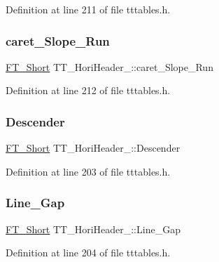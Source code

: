 Definition at line 211 of file tttables.\+h.

\mbox{\label{struct_t_t___hori_header___acce162ae0554006c11a3383bd3454d69}} 
\subsubsection{\texorpdfstring{caret\_Slope\_Run}{caret\_Slope\_Run}}
{\footnotesize\ttfamily \mbox{\hyperlink{fttypes_8h_aa7279be89046a2563cd3d4d6651fbdcf}{F\+T\+\_\+\+Short}} T\+T\+\_\+\+Hori\+Header\+\_\+\+::caret\+\_\+\+Slope\+\_\+\+Run}



Definition at line 212 of file tttables.\+h.

\mbox{\label{struct_t_t___hori_header___ad5be55a98dfaa079a2aaa462034a1512}} 
\subsubsection{\texorpdfstring{Descender}{Descender}}
{\footnotesize\ttfamily \mbox{\hyperlink{fttypes_8h_aa7279be89046a2563cd3d4d6651fbdcf}{F\+T\+\_\+\+Short}} T\+T\+\_\+\+Hori\+Header\+\_\+\+::\+Descender}



Definition at line 203 of file tttables.\+h.

\mbox{\label{struct_t_t___hori_header___a4165055ed05e42a2e5eed805bfe3fd7d}} 
\subsubsection{\texorpdfstring{Line\_Gap}{Line\_Gap}}
{\footnotesize\ttfamily \mbox{\hyperlink{fttypes_8h_aa7279be89046a2563cd3d4d6651fbdcf}{F\+T\+\_\+\+Short}} T\+T\+\_\+\+Hori\+Header\+\_\+\+::\+Line\+\_\+\+Gap}



Definition at line 204 of file tttables.\+h.

